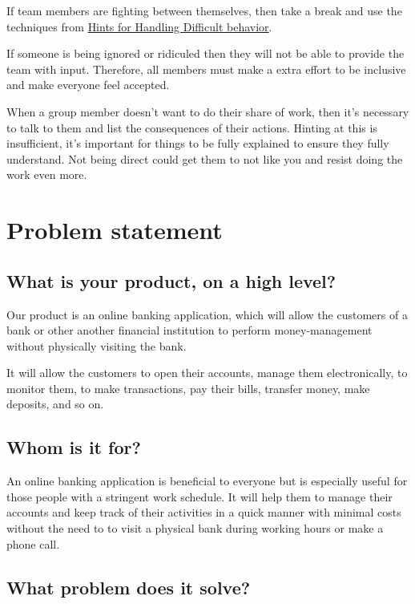 \documentclass[
10pt, %
letterpaper, %
oneside, %
headinclude,footinclude, %
BCOR5mm, %
]{scrartcl}
\begin{document}
If team members are fighting between themselves, then take a break and
use the techniques from
\protect\hyperlink{hints-for-handling-difficult-behavior}{Hints for
Handling Difficult behavior}.

If someone is being ignored or ridiculed then they will not be able to
provide the team with input. Therefore, all members must make a extra
effort to be inclusive and make everyone feel accepted.

When a group member doesn't want to do their share of work, then it's
necessary to talk to them and list the consequences of their actions.
Hinting at this is insufficient, it's important for things to be fully
explained to ensure they fully understand. Not being direct could get
them to not like you and resist doing the work even more.

\section{Problem statement}

\subsection{What is your product, on a high level?}

Our product is an online banking application, which will allow the
customers of a bank or other another financial institution to perform
money-management without physically visiting the bank.

It will allow the customers to open their accounts, manage them
electronically, to monitor them, to make transactions, pay their bills,
transfer money, make deposits, and so on.

\subsection{Whom is it for?}

An online banking application is beneficial to everyone but is
especially useful for those people with a stringent work schedule. It
will help them to manage their accounts and keep track of their
activities in a quick manner with minimal costs without the need to to
visit a physical bank during working hours or make a phone call.

\subsection{What problem does it
solve?}
\end{document}
